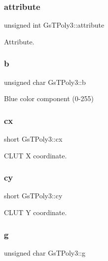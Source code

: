 \subsubsection{\texorpdfstring{attribute}{attribute}}
{\footnotesize\ttfamily unsigned int Gs\+T\+Poly3\+::attribute}



Attribute. 

\mbox{\label{structGsTPoly3_a889229e60bd4bfed549ee3fc5e9346da}} 
\subsubsection{\texorpdfstring{b}{b}}
{\footnotesize\ttfamily unsigned char Gs\+T\+Poly3\+::b}



Blue color component (0-\/255) 

\mbox{\label{structGsTPoly3_a43b86f46391cd471dc92a9dec1a3b46f}} 
\subsubsection{\texorpdfstring{cx}{cx}}
{\footnotesize\ttfamily short Gs\+T\+Poly3\+::cx}



C\+L\+UT X coordinate. 

\mbox{\label{structGsTPoly3_a825c6c03d56ff019f7845f06222d096a}} 
\subsubsection{\texorpdfstring{cy}{cy}}
{\footnotesize\ttfamily short Gs\+T\+Poly3\+::cy}



C\+L\+UT Y coordinate. 

\mbox{\label{structGsTPoly3_a4bef416306bb3d0710b26fefc75a3e6e}} 
\subsubsection{\texorpdfstring{g}{g}}
{\footnotesize\ttfamily unsigned char Gs\+T\+Poly3\+::g}



